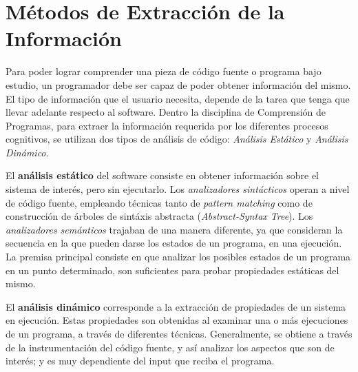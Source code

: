 \section{Métodos de Extracción de la Información}

Para poder lograr comprender una pieza de código fuente o programa bajo estudio, un
programador debe ser capaz de poder obtener información del mismo.
El tipo de información que el usuario necesita, depende de la tarea que tenga que llevar
adelante respecto al software.
Dentro la disciplina de Comprensión de Programas, para extraer la información requerida 
por los diferentes procesos cognitivos, se utilizan dos tipos de análisis de código:
\textit{Análisis Estático} y \textit{Análisis Dinámico}.

El \textbf{análisis estático} del software consiste en obtener información sobre el 
sistema de interés, pero sin ejecutarlo.
Los \textit{analizadores sintácticos} operan a nivel de código fuente, empleando
técnicas tanto de \textit{pattern matching} como de construcción de árboles de sintáxis
abstracta (\textit{Abstract-Syntax Tree}).
Los \textit{analizadores semánticos} trajaban de una manera diferente, ya que consideran
la secuencia en la que pueden darse los estados de un programa, en una ejecución.
La premisa principal consiste en que analizar los posibles estados de un programa en un
punto determinado, son suficientes para probar propiedades estáticas del mismo.
\cite{Cousot77}

El \textbf{análisis dinámico} corresponde a la extracción de propiedades de un sistema
en ejecución.
Estas propiedades son obtenidas al examinar una o más ejecuciones de un programa, a
través de diferentes técnicas.
Generalmente, se obtiene a través de la instrumentación del código fuente, y así
analizar los aspectos que son de interés; y es muy dependiente del input que reciba
el programa.
\cite{Ball99}
